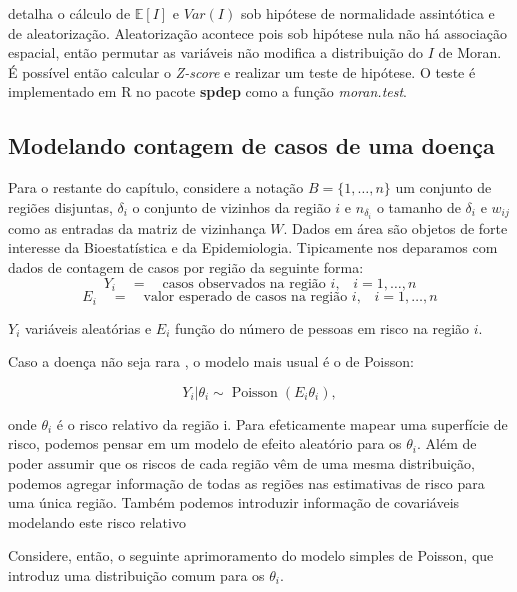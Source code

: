 \cite{Cliff1981} detalha o cálculo de $\mathds{E}[I]$ e $Var(I)$ sob hipótese de normalidade assintótica e de aleatorização.
Aleatorização acontece pois sob hipótese nula não há associação espacial, então permutar as variáveis não modifica a distribuição do $I$ de Moran.
É possível então calcular o \textit{Z-score} e realizar um teste de hipótese.
O teste é implementado em R no pacote \textbf{spdep} como a função \textit{moran.test}.

\subsection{Modelando contagem de casos de uma doença}

Para o restante do capítulo, considere a notação $B = \{1, \dots, n\}$ um conjunto de regiões disjuntas, $\delta_i$ o conjunto de vizinhos da região $i$ e $n_{\delta_i}$ o tamanho de $\delta_i$ e $w_{ij}$ como as entradas da matriz de vizinhança $W$.
Dados em área são objetos de forte interesse da Bioestatística e da Epidemiologia.
Tipicamente nos deparamos com dados de contagem de casos por região da seguinte forma:
\[Y_i \quad = \quad \text{casos observados na região $i$,}\quad i=1,\dots,n\]
\[E_i \quad = \quad \text{valor esperado de casos na região $i$,}\quad i=1,\dots,n\]

$Y_i$ variáveis aleatórias e $E_i$ função do número de pessoas em risco na região $i$. 


Caso a doença não seja rara \cite{Banerjee2015}, o modelo mais usual é o de Poisson:

\begin{equation}
    \label{eq: poisson}
    Y_i|\theta_i \sim \operatorname{Poisson}(E_i \theta_i),
\end{equation}

onde $\theta_i$ é o risco relativo da região i. Para efeticamente mapear uma superfície de risco, podemos pensar em um modelo de efeito aleatório para os $\theta_i$.
Além de poder assumir que os riscos de cada região vêm de uma mesma distribuição, podemos agregar informação de todas as regiões nas estimativas de risco para uma única região. Também podemos introduzir informação de covariáveis modelando este risco relativo

Considere, então, o seguinte aprimoramento do modelo simples de Poisson, que introduz uma distribuição comum para os $\theta_i$.  

